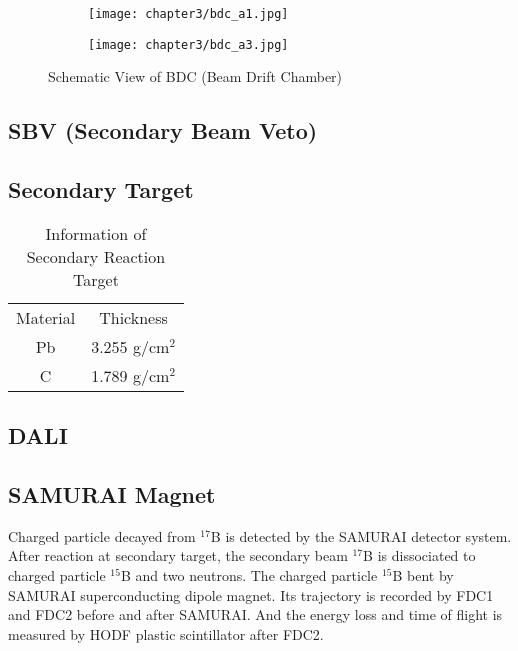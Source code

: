 \begin{figure}[h]
    \centering
    \begin{subfigure}{\textwidth}
        \centering
        \texttt{[image: chapter3/bdc\_a1.jpg]}    
    \end{subfigure}
    \begin{subfigure}{\textwidth}
        \hspace{1.5cm}
        \texttt{[image: chapter3/bdc\_a3.jpg]}
    \end{subfigure}
    \caption{Schematic View of BDC (Beam Drift Chamber) \cite{SAMURAI}}
\end{figure}

\clearpage

\subsection{SBV (Secondary Beam Veto)}

\subsection{Secondary Target}

\begin{table}[h]
    \centering
    \begin{tabular}{c|c}
        \hline
        Material & Thickness \\
        Pb & 3.255 g/cm${}^{2}$\\
         C & 1.789 g/cm${}^{2}$ \\
        \hline
    \end{tabular}
    \caption{Information of Secondary Reaction Target \cite{Dayonewiki}}
\end{table}

\subsection{DALI}

\subsection{SAMURAI Magnet}
Charged particle decayed from ${}^{17}$B is detected by the SAMURAI detector system. After reaction at secondary target, the secondary beam ${}^{17}$B is dissociated to charged particle ${}^{15}$B and two neutrons. The charged particle ${}^{15}$B bent by SAMURAI superconducting dipole magnet. Its trajectory is recorded by FDC1 and FDC2 before and after SAMURAI. And the energy loss and time of flight is measured by HODF plastic scintillator after FDC2.




